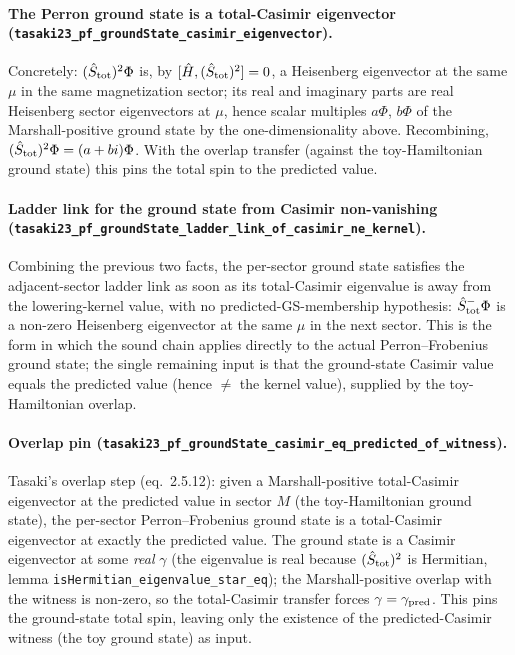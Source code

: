 \documentclass[a4paper,11pt]{article}
\begin{document}
\paragraph{The Perron ground state is a total-Casimir eigenvector
(\texttt{tasaki23\_pf\_groundState\_casimir\_eigenvector}).} Concretely:
$(\hat S_{\rm tot})^2\Phi$ is, by $[\hat H,(\hat S_{\rm tot})^2]=0$, a Heisenberg
eigenvector at the same $\mu$ in the same magnetization sector; its real and
imaginary parts are real Heisenberg sector eigenvectors at $\mu$, hence scalar
multiples $a\Phi$, $b\Phi$ of the Marshall-positive ground state by the
one-dimensionality above. Recombining, $(\hat S_{\rm tot})^2\Phi=(a+bi)\Phi$.
With the overlap transfer (against the toy-Hamiltonian ground state) this pins
the total spin to the predicted value.

\paragraph{Ladder link for the ground state from Casimir non-vanishing
(\texttt{tasaki23\_pf\_groundState\_ladder\_link\_of\_casimir\_ne\_kernel}).}
Combining the previous two facts, the per-sector ground state satisfies the
adjacent-sector ladder link as soon as its total-Casimir eigenvalue is away
from the lowering-kernel value, with no predicted-GS-membership hypothesis:
$\hat S^-_{\rm tot}\Phi$ is a non-zero Heisenberg eigenvector at the same
$\mu$ in the next sector. This is the form in which the sound chain applies
directly to the actual Perron--Frobenius ground state; the single remaining
input is that the ground-state Casimir value equals the predicted value
(hence $\neq$ the kernel value), supplied by the toy-Hamiltonian overlap.

\paragraph{Overlap pin
(\texttt{tasaki23\_pf\_groundState\_casimir\_eq\_predicted\_of\_witness}).}
Tasaki's overlap step (eq.~2.5.12): given a Marshall-positive total-Casimir
eigenvector at the predicted value in sector $M$ (the toy-Hamiltonian ground
state), the per-sector Perron--Frobenius ground state is a total-Casimir
eigenvector at exactly the predicted value. The ground state is a Casimir
eigenvector at some \emph{real} $\gamma$ (the eigenvalue is real because
$(\hat S_{\rm tot})^2$ is Hermitian, lemma
\texttt{isHermitian\_eigenvalue\_star\_eq}); the Marshall-positive overlap with
the witness is non-zero, so the total-Casimir transfer forces
$\gamma=\gamma_{\rm pred}$. This pins the ground-state total spin, leaving only
the existence of the predicted-Casimir witness (the toy ground state) as input.
\end{document}
